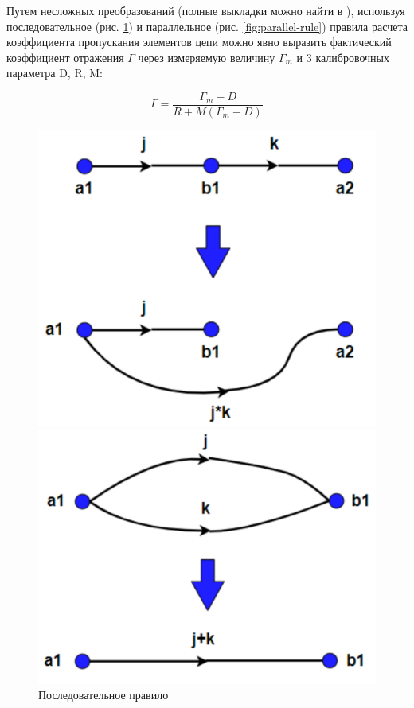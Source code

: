 \documentclass[a4paper]{article}
\begin{document}
Путем несложных преобразований (полные выкладки можно найти в \cite{Walker}), используя последовательное (рис. \ref{fig:series-rule}) и параллельное (рис. \ref{fig:parallel-rule}) правила расчета коэффициента пропускания элементов цепи можно явно выразить фактический коэффициент отражения $\Gamma$  через измеряемую величину $\Gamma_m$ и 3 калибровочных параметра D, R, M:

\begin{equation}
    \Gamma = \frac{\Gamma_m - D}{R + M(\Gamma_m - D)}
    \label{gamma}
\end{equation}

\begin{figure}[H]
    \begin{center}
        \begin{minipage}[H]{0.4\linewidth}
            \includegraphics[width=1\linewidth]{series-rule.png}
            \caption{Последовательное правило \cite{Walker}} 
            \label{fig:series-rule}
        \end{minipage}
        \hfill 
        \begin{minipage}[H]{0.45\linewidth}
            \includegraphics[width=1\linewidth]{parallel-rule.png}

\end{minipage}
\end{center}
\end{figure}
\end{document}
